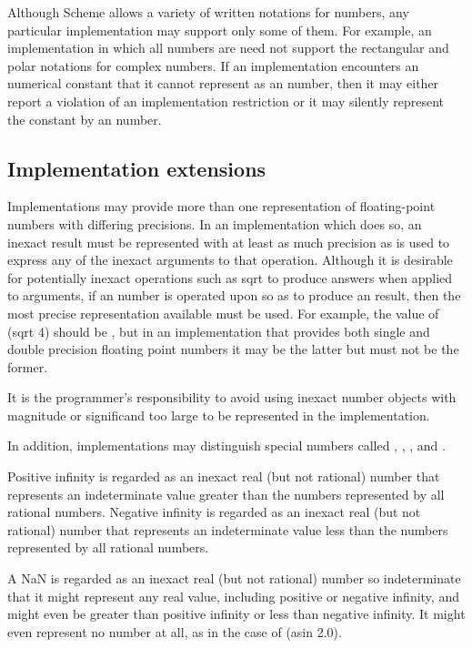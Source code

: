 Although Scheme allows a variety of written
notations for
numbers, any particular implementation may support only some of them.
For example, an implementation in which all numbers are 
need not support the rectangular and polar notations for complex
numbers.  If an implementation encounters an  numerical constant that
it cannot represent as an  number, then it may either report a
violation of an implementation restriction or it may silently represent the
constant by an  number.

\subsection{Implementation extensions}

\vest Implementations may provide more than one representation of
floating-point numbers with differing precisions.  In an implementation
which does so, an inexact result must be represented with at least
as much precision as is used to express any of the inexact arguments
to that operation.  Although it is desirable for potentially inexact
operations such as {\cf sqrt} to produce  answers when
applied to  arguments, if an  number is operated
upon so as to produce an  result, then the most precise
representation available must be used.  For example, the value of {\cf
(sqrt 4)} should be {}, but in an implementation that provides both
single and double precision floating point numbers it may be the latter
but must not be the former.

It is the programmer's responsibility to avoid using inexact
number objects with magnitude or significand too large to be
represented in the implementation.

In addition, implementations may
distinguish special numbers called ,
, , and .

Positive infinity is regarded as an inexact real (but not rational)
number that represents an indeterminate value greater than the
numbers represented by all rational numbers. Negative infinity
is regarded as an inexact real (but not rational) number that
represents an indeterminate value less than the numbers represented
by all rational numbers.

A NaN is regarded as an inexact real (but not rational) number
so indeterminate that it might represent any real value, including
positive or negative infinity, and might even be greater than positive
infinity or less than negative infinity.
It might even represent no number at all, as in the case of 
{\cf (asin 2.0)}.

